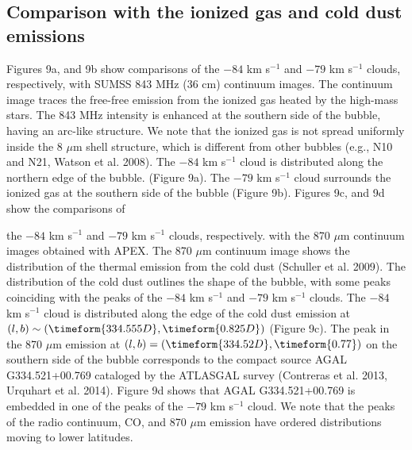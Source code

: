 \documentclass[onecolumn]{pasj01}
\begin{document}
{{{{{\subsection{Comparison with the ionized gas and cold dust emissions}
{Figures 9a, and 9b} show comparison{s} {of} {the $-84$ km s$^{-1}$ and $-79$ km s$^{-1}$ cloud{s, respectively,}} with SUMSS 843 MHz (36 cm) continuum images.
{The continuum image} traces {the} free-free emission from the ionized gas heated by the high-mass stars. 
The 843 MHz intensity is enhanced {at} the southern side of the bubble, having {an arc-like structure.} 
{We note that the ionized gas is not spread uniformly inside the 8 $\mu$m shell structure, which is different from other bubbles (e.g., N10 and N21, Watson et al. 2008).}
{The $-84$ km s$^{-1}$ cloud {is distributed along} the northern edge of the bubble. ({Figure 9a}).
The $-79$ km s$^{-1}$ cloud {surrounds} the ionized gas at the southern side of the bubble ({Figure 9b}).}
{Figures 9c, and 9d} show the comparison{s} of {the $-84$ km s$^{-1}$ and $-79$ km s$^{-1}$ cloud{s, respectively.} with the 870 $\mu$m continuum images {obtained with APEX}.
The 870 $\mu$m continuum image {shows} the distribution of  the thermal emission from the cold dust (Schuller et al. 2009).
The distribution of the cold dust {outlines} the shape of the bubble{, with some peaks {coinciding} with the peaks of the $-84$ km s$^{-1}$ and $-79$ km s$^{-1}$ clouds.}
The $-84$ km s$^{-1}$ cloud {is distributed along} the edge of the cold dust emission at {$(l,b)\sim (\timeform{334.555D}, \timeform{0.825D})$} ({Figure 9c}). 
{The peak in the 870 $\mu$m emission} at $(l,b)=(\timeform{334.52D}, \timeform{0.77})$ {on} the southern side of the bubble {corresponds} to the compact source AGAL G334.521+00.769 cataloged by the ATLASGAL survey (Contreras et al. 2013, Urquhart et al. 2014). {{Figure 9d}} shows that AGAL G334.521+00.769 {is embedded in} {one of {the} peaks} of the $-79$ km s$^{-1}$ cloud. {We note that the peaks of {the} radio continuum, CO, and 870 $\mu$m {emission have ordered} distributions moving to lower latitude{s}.}

}}}}}}
\end{document}
